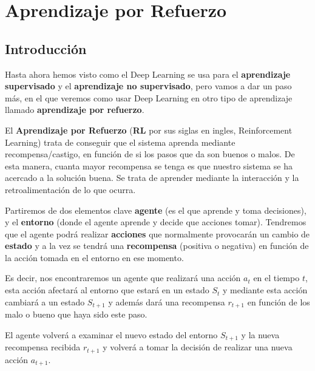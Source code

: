 \documentclass[
  a4paper,
  DIV=11,
  numbers=noendperiod]{scrreprt}
\begin{document}
\hypertarget{aprendizaje-por-refuerzo}{%
\section{Aprendizaje por Refuerzo}\label{aprendizaje-por-refuerzo}}

\hypertarget{introducciuxf3n-3}{%
\subsection{Introducción}\label{introducciuxf3n-3}}

Hasta ahora hemos visto como el Deep Learning se usa para el
\textbf{aprendizaje supervisado} y el \textbf{aprendizaje no
supervisado}, pero vamos a dar un paso más, en el que veremos como usar
Deep Learning en otro tipo de aprendizaje llamado \textbf{aprendizaje
por refuerzo}.

El \textbf{Aprendizaje por Refuerzo} (\textbf{RL} por sus siglas en
ingles, Reinforcement Learning) trata de conseguir que el sistema
aprenda mediante recompensa/castigo, en función de si los pasos que da
son buenos o malos. De esta manera, cuanta mayor recompensa se tenga es
que nuestro sistema se ha acercado a la solución buena. Se trata de
aprender mediante la interacción y la retroalimentación de lo que
ocurra.

Partiremos de dos elementos clave \textbf{agente} (es el que aprende y
toma decisiones), y el \textbf{entorno} (donde el agente aprende y
decide que acciones tomar). Tendremos que el agente podrá realizar
\textbf{acciones} que normalmente provocarán un cambio de
\textbf{estado} y a la vez se tendrá una \textbf{recompensa} (positiva o
negativa) en función de la acción tomada en el entorno en ese momento.

Es decir, nos encontraremos un agente que realizará una acción \(a_t\)
en el tiempo \(t\), esta acción afectará al entorno que estará en un
estado \(S_t\) y mediante esta acción cambiará a un estado \(S_{t+1}\) y
además dará una recompensa \(r_{t+1}\) en función de los malo o bueno
que haya sido este paso.

El agente volverá a examinar el nuevo estado del entorno \(S_{t+1}\) y
la nueva recompensa recibida \(r_{t+1}\) y volverá a tomar la decisión
de realizar una nueva acción \(a_{t+1}\).
\end{document}
